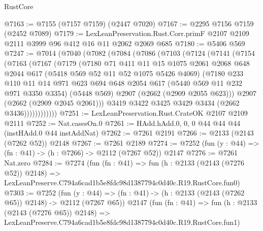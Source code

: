 \begin{lexlean}{RustCore}
\begin{coremodule}
@7163 := @7155 (@7157 @7159) (@2447 @7020)
@7167 := @2295 @7156 @7159 (@2452 @7089)
@7179 := LexLeanPreservation.Rust.Corr.primF
    @2107
    @2109
    @2111
    @3999
    @96
    @412
    @16
    @11
    @2062
    @2069
    @685
@7180 := @5406 @569
@7247 := @7014
    (@7040
      (@7082
        (@7084
          (@7086
            (@7103
              (@7124
                (@7141
                  (@7154
                    (@7163
                      (@7167
                        (@7179
                          (@7180
                            @71
                            @411
                            @11
                            @15
                            @1075
                            @2061
                            @2068
                            @648
                            @2044
                            @617
                            (@5418 @569 @52 @11 @52 @1075 @5426 @4069)
                            (@7180
                              @233
                              @110
                              @11
                              @14
                              @971
                              @623
                              @694
                              @648
                              @2054
                              @617
                              (@5440 @569 @11 @232 @971 @3350 @3354)
                              (@5448 @569)
                              @2907
                              (@2662 (@2909 @2055 @623)))
                            @2907
                            (@2662 (@2909 @2045 @2061)))
                          @3419
                          @3422
                          @3425
                          @3429
                          @3434
                          (@2662 @3436))))))))))))
@7251 := LexLeanPreservation.Rust.CrateOK @2107 @2109 @2111
@7252 := Nat.casesOn.{0}
@7261 := HAdd.hAdd.{0, 0, 0} @44 @44 @44 (instHAdd.{0} @44 instAddNat)
@7262 := @7261 @2191
@7266 := @2133 (@2143 (@7262 @52)) @2148
@7267 := @7261 @2189
@7274 := @7252 (fun (y : @44) => (fn : @41) -> (h : @7266) -> @2112 (@7267 @52)) @2147
@7276 := @7261 Nat.zero
@7284 := @7274
    (fun (fn : @41) =>
    fun (h : @2133 (@2143 (@7276 @52)) @2148) =>
    LexLeanPreserve.C794a6cad1b5e8fdc98d1387794c0d40c.R19.RustCore.fun0)
@7303 := @7252
    (fun (y : @44) => (fn : @41) -> (h : @2133 (@2143 (@7262 @65)) @2148) -> @2112 (@7267 @65))
    @2147
    (fun (fn : @41) =>
    fun (h : @2133 (@2143 (@7276 @65)) @2148) =>
    LexLeanPreserve.C794a6cad1b5e8fdc98d1387794c0d40c.R19.RustCore.fun1)

\end{coremodule}
\end{lexlean}
